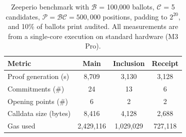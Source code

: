 \begin{table}[t!]
\centering
\caption{Zeeperio benchmark with $\mathcal{B}$ = 100,000 ballots, $\mathcal{C}$ = 5 candidates, $\mathcal{P} = \mathcal{B}\mathcal{C} = 500,000$ positions, padding to $2^{20}$, and 10\% of ballots print audited. All measurements are from a single-core execution on standard hardware (M3 Pro).}
\begin{tabular}{lccc}
\hline
\textbf{Metric} & \textbf{Main} & \textbf{Inclusion} & \textbf{Receipt} \\
\hline
Proof generation (s) & 8,709 & 3,130 & 3,128 \\
Commitments (\#) & 24 & 13 & 6 \\
Opening points (\#) & 6 & 2 & 2 \\
Calldata size (bytes) & 8,416 & 4,128 & 2,688 \\
Gas used & 2,429,116 & 1,029,029 & 727,118 \\
\hline
\end{tabular}
\label{tab:eval-table2}
\end{table}
